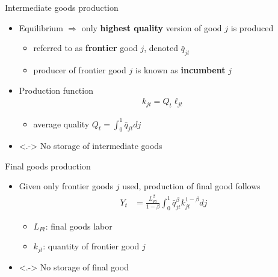 \documentclass[english,usenames,dvipsnames]{beamer}
\begin{document}
\begin{frame}{Intermediate goods production}\label{intermediate_goods_production}
	\begin{itemize}
		\item<+-> Equilibrium $\Rightarrow$ only \alert{\textbf{highest quality}} version of good $j$ is produced \hyperlink{two_stage_bertrand2}{}
		\begin{itemize}
			\item referred to as \alert{\textbf{frontier}} good $j$, denoted $\bar{q}_{jt}$
			\item producer of frontier good $j$ is known as  \alert{\textbf{incumbent}} $j$ 
		\end{itemize}
		\medskip
		\item<+-> Production function
		\begin{align*}
		k_{jt} = Q_t \ell_{jt}
		\end{align*}
		\begin{itemize}
			\item average quality $Q_t = \int_0^1 \bar{q}_{jt} dj$
		\end{itemize}
		\medskip
		\item<.-> No storage of intermediate goods 
	\end{itemize}
\end{frame}

\begin{frame}{Final goods production}\label{main:final_goods_production}
	\begin{itemize}
		\item<+-> Given only frontier goods $j$ used, production of final good follows
		\begin{align*}
		Y_t &= \frac{L_{Ft}^{\beta}}{1-\beta} \int_0^1 \bar{q}_{jt}^{\beta} k_{jt}^{1-\beta} dj 
		\end{align*}
		\begin{itemize}
			\item $L_{Ft}$: final goods labor
			\item $k_{jt}$: quantity of frontier good $j$
		\end{itemize} \hyperlink{definition:final_goods_production}{} 
		\smallskip
		\item<.-> No storage of final good
	\end{itemize}
\end{frame}
\end{document}
